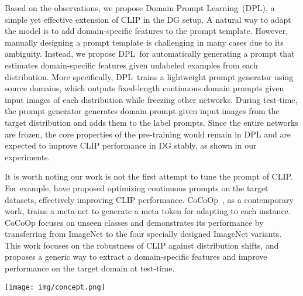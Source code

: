 \documentclass[letterpaper]{article} \usepackage[]{aaai23}
\newcommand{\dplshort}{DPL}
\newcommand{\dpllong}{Domain Prompt Learning}
\begin{document}
Based on the observations, we propose \dpllong~(\dplshort), a simple yet effective extension of CLIP in the DG setup.
A natural way to adapt the model is to add domain-specific features to the prompt template.
However, manually designing a prompt template is challenging in many cases due to its ambiguity. 
Instead, we propose \dplshort~for automatically generating a prompt that estimates domain-specific features given unlabeled examples from each distribution.
More specifically, \dplshort~trains a lightweight prompt generator using source domains, which outputs fixed-length continuous domain prompts given input images of each distribution while freezing other networks. 
During test-time, the prompt generator generates domain prompt given input images from the target distribution and adds them to the label prompts. 
Since the entire networks are frozen, the core properties of the pre-training would remain in DPL and are expected to improve CLIP performance in DG stably, as shown in our experiments. 

It is worth noting our work is not the first attempt to tune the prompt of CLIP. 
For example, \cite{gao2021clipadapter, zhou2021coop} have proposed optimizing continuous prompts on the target datasets, effectively improving CLIP performance. 
CoCoOp~\cite{zhou2022conditional}, as a contemporary work, trains a meta-net to generate a meta token for adapting to each instance. 
CoCoOp focuses on unseen classes and demonstrates its performance by transferring from ImageNet to the four specially designed ImageNet variants. 
This work focuses on the robustness of CLIP against distribution shifts, and proposes a generic way to extract a domain-specific features and improve performance on the target domain at test-time. 

\begin{figure*}[t]
\begin{center}
\texttt{[image: img/concept.png]}
\end{center}
  \caption{
  The concept illustration of three approaches to apply CLIP in DG.
  (1) Fine-tuning updates the CLIP's image encoder with a trainable classifier.
  (2) Zero-shot CLIP contrastive prediction with hand-craft prompts at the test time without updating parameters on the train domains.
  (3) Prompt learning trains a prompt optimizer then utilize the optimized prompts to prediction.
  Our \dplshort~is categorized to (3) Prompt learning, which trains a prompt generator in train phase and infers unseen domain to generate a domain-specific prompt.
 }
\label{fig:concept}
\end{figure*}
\end{document}
